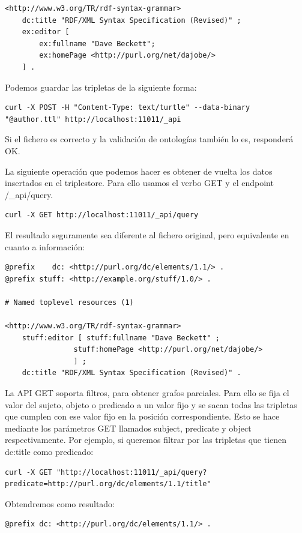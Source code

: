 \documentclass[12pt]{report} %
\begin{document}
\begin{itemize}
\begin{lstlisting}
<http://www.w3.org/TR/rdf-syntax-grammar>
    dc:title "RDF/XML Syntax Specification (Revised)" ;
    ex:editor [
        ex:fullname "Dave Beckett";
        ex:homePage <http://purl.org/net/dajobe/>
    ] .
\end{lstlisting}

Podemos guardar las tripletas de la siguiente forma:
\begin{verbatim}
curl -X POST -H "Content-Type: text/turtle" --data-binary "@author.ttl" http://localhost:11011/_api
\end{verbatim}

Si el fichero es correcto y la validación de ontologías también lo es, responderá OK.

La siguiente operación que podemos hacer es obtener de vuelta los datos insertados en el triplestore. Para ello usamos el verbo GET y el endpoint /\_api/query.

\begin{verbatim}
curl -X GET http://localhost:11011/_api/query
\end{verbatim}

El resultado seguramente sea diferente al fichero original, pero equivalente en cuanto a información:
\begin{verbatim}                                                 
@prefix    dc: <http://purl.org/dc/elements/1.1/> .
@prefix stuff: <http://example.org/stuff/1.0/> .

# Named toplevel resources (1)

<http://www.w3.org/TR/rdf-syntax-grammar>
    stuff:editor [ stuff:fullname "Dave Beckett" ;
                stuff:homePage <http://purl.org/net/dajobe/>
                ] ;
    dc:title "RDF/XML Syntax Specification (Revised)" .
\end{verbatim}

La API GET soporta filtros, para obtener grafos parciales. Para ello se fija el valor del sujeto, objeto o predicado a un valor fijo y se sacan todas las tripletas que cumplen con ese valor fijo en la posición correspondiente. Esto se hace mediante los parámetros GET llamados subject, predicate y object respectivamente. Por ejemplo, si queremos filtrar por las tripletas que tienen dc:title como predicado:

\begin{verbatim}
curl -X GET "http://localhost:11011/_api/query?predicate=http://purl.org/dc/elements/1.1/title"
\end{verbatim}

Obtendremos como resultado:
\begin{verbatim}
@prefix dc: <http://purl.org/dc/elements/1.1/> .


\end{verbatim}
\end{itemize}
\end{document}
